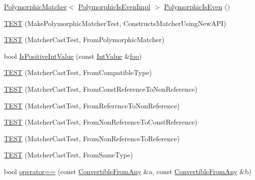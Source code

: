 \begin{DoxyCompactItemize}
\item 
\hyperlink{classtesting_1_1PolymorphicMatcher}{Polymorphic\+Matcher}$<$ \hyperlink{classtesting_1_1gmock__matchers__test_1_1PolymorphicIsEvenImpl}{Polymorphic\+Is\+Even\+Impl} $>$ \hyperlink{namespacetesting_1_1gmock__matchers__test_a8a0035a0de2d219d89ff7070762ece72}{Polymorphic\+Is\+Even} ()
\item 
\hyperlink{namespacetesting_1_1gmock__matchers__test_a619d872aa86419c5093327f64c466df3}{T\+E\+ST} (Make\+Polymorphic\+Matcher\+Test, Constructs\+Matcher\+Using\+New\+A\+PI)
\item 
\hyperlink{namespacetesting_1_1gmock__matchers__test_afffaa6f2c436edb7c46e7a16ed2de825}{T\+E\+ST} (Matcher\+Cast\+Test, From\+Polymorphic\+Matcher)
\item 
bool \hyperlink{namespacetesting_1_1gmock__matchers__test_a68565741c989968637db5a9e10e55020}{Is\+Positive\+Int\+Value} (const \hyperlink{classtesting_1_1gmock__matchers__test_1_1IntValue}{Int\+Value} \&\hyperlink{namespacetesting_1_1gmock__matchers__test_a3536e68112ffbb1f76887cd15bb45c15}{foo})
\item 
\hyperlink{namespacetesting_1_1gmock__matchers__test_aa7a28536a6c59d56bbbbdb4fa5ba9e4d}{T\+E\+ST} (Matcher\+Cast\+Test, From\+Compatible\+Type)
\item 
\hyperlink{namespacetesting_1_1gmock__matchers__test_a9d25aac0defd9296bf207cacd342aff0}{T\+E\+ST} (Matcher\+Cast\+Test, From\+Const\+Reference\+To\+Non\+Reference)
\item 
\hyperlink{namespacetesting_1_1gmock__matchers__test_a4bb3955a1e0b603c0156c98a2dc49eea}{T\+E\+ST} (Matcher\+Cast\+Test, From\+Reference\+To\+Non\+Reference)
\item 
\hyperlink{namespacetesting_1_1gmock__matchers__test_a6fd48b8275f96d9d4ee840f0ec590fb1}{T\+E\+ST} (Matcher\+Cast\+Test, From\+Non\+Reference\+To\+Const\+Reference)
\item 
\hyperlink{namespacetesting_1_1gmock__matchers__test_ab8d3174b8f1ab799906938ed9984643b}{T\+E\+ST} (Matcher\+Cast\+Test, From\+Non\+Reference\+To\+Reference)
\item 
\hyperlink{namespacetesting_1_1gmock__matchers__test_a8f845dd5b1bcdc660926d67dce32b5d2}{T\+E\+ST} (Matcher\+Cast\+Test, From\+Same\+Type)
\item 
bool \hyperlink{namespacetesting_1_1gmock__matchers__test_af0b7ba716a9150ff6db37abda4b44fc8}{operator==} (const \hyperlink{structtesting_1_1gmock__matchers__test_1_1ConvertibleFromAny}{Convertible\+From\+Any} \&a, const \hyperlink{structtesting_1_1gmock__matchers__test_1_1ConvertibleFromAny}{Convertible\+From\+Any} \&b)

\end{DoxyCompactItemize}
